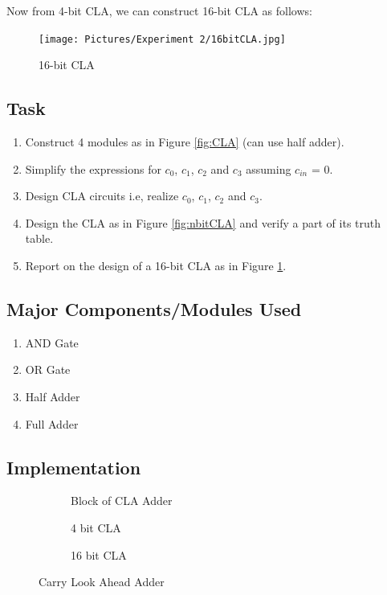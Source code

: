 \documentclass[a4paper]{article}
\begin{document}
Now from 4-bit CLA, we can construct 16-bit CLA as follows:

\begin{figure}[h!]
    \centering
    \texttt{[image: Pictures/Experiment 2/16bitCLA.jpg]}
    \caption{16-bit CLA}
    \label{fig:16bitCLA}
\end{figure}


\subsection{Task}
\begin{enumerate}
    \item Construct 4 modules as in Figure \ref{fig:CLA} (can use half adder).
    \item Simplify the expressions for $c_0$, $c_1$, $c_2$ and $c_3$ assuming $c_{in}$ = 0.
    \item Design CLA circuits i.e, realize $c_0$, $c_1$, $c_2$ and $c_3$.
    \item Design the CLA as in Figure \ref{fig:nbitCLA} and verify a part of its truth table.
    \item Report on the design of a 16-bit CLA as in Figure \ref{fig:16bitCLA}.
\end{enumerate}

\subsection{Major Components/Modules Used}
\begin{enumerate}
    \item AND Gate
    \item OR Gate
    \item Half Adder
    \item Full Adder
\end{enumerate}
\pagebreak
\subsection{Implementation}
\begin{figure}[h!]
    \centering
    \begin{subfigure}[b]{\linewidth}
        \centering
        \caption{Block of CLA Adder}
    \end{subfigure}
    \begin{subfigure}[b]{\linewidth}
        \centering
        \caption{4 bit CLA}
        \label{subFig:4bCLA}
    \end{subfigure}
    \begin{subfigure}[b]{\linewidth}
        \centering
        \caption{16 bit CLA}
        \label{subFig:16bCLA}
    \end{subfigure}
    \caption{Carry Look Ahead Adder}
    \label{Fig:ImpCLA}
\end{figure}
\end{document}
